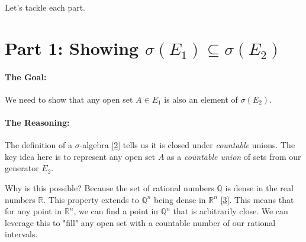 \documentclass[11pt,a4paper]{article}
\theoremstyle{tutorstyle}
\begin{document}
Let's tackle each part.

\section*{Part 1: Showing $\sigma(E_1) \subseteq \sigma(E_2)$}

\paragraph{The Goal:} We need to show that any open set $A \in E_1$ is also an element of $\sigma(E_2)$.

\paragraph{The Reasoning:}
The definition of a $\sigma$-algebra \hyperlink{concept:sigma-algebra}{[2]} tells us it is closed under \textit{countable} unions. The key idea here is to represent any open set $A$ as a \textit{countable union} of sets from our generator $E_2$.

Why is this possible? Because the set of rational numbers $\mathbb{Q}$ is dense in the real numbers $\mathbb{R}$. This property extends to $\mathbb{Q}^n$ being dense in $\mathbb{R}^n$ \hyperlink{concept:dense}{[3]}. This means that for any point in $\mathbb{R}^n$, we can find a point in $\mathbb{Q}^n$ that is arbitrarily close. We can leverage this to "fill" any open set with a countable number of our rational intervals.
\end{document}
